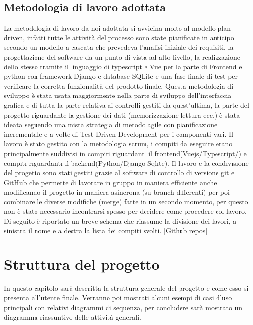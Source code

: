 \documentclass[ 4paper,11pt,openany]{book}
\newcommand{\ao}[1]{{\color{ao}[#1]}}
\begin{document}
	
\section{Metodologia di lavoro adottata}
La metodologia di lavoro da noi adottata si avvicina molto al modello plan driven, infatti tutte le attività del processo sono state pianificate in anticipo secondo un modello a cascata che prevedeva l'analisi iniziale dei requisiti, la progettazione del software da un punto di vista ad alto livello, la realizzazione dello stesso tramite il linguaggio di typescript e Vue per la parte di Frontend e python con framework Django e database SQLite e una fase finale di test per verificare la corretta funzionalità del prodotto finale.
Questa metodologia di sviluppo è stata usata maggiormente nella parte di sviluppo dell'interfaccia grafica e di tutta la parte relativa ai controlli gestiti da quest'ultima, la parte del progetto riguardante la gestione dei dati (memorizzazione lettura ecc.) è stata ideata seguendo una mista strategia di metodo agile con pianificazione incrementale e a volte di Test Driven Development per i componenti vari. Il lavoro è stato gestito con la metodologia scrum, i compiti da eseguire erano principalmente suddivisi in compiti riguardanti il frontend(Vuejs/Typescript/) e compiti riguardanti il backend(Python/Django-Sqlite). 
Il lavoro e la condivisione del progetto sono stati gestiti grazie al software di controllo di versione git e GitHub che permette di lavorare in gruppo in maniera efficiente anche modificando il progetto in maniera asincrona (su branch differenti) per poi combinare le diverse modifiche (merge) fatte in un secondo momento, per questo non è stato necessario incontrarsi spesso per decidere come procedere col lavoro.  Di seguito è riportato un breve schema che riassume la divisione dei lavori, a sinistra il nome e a destra la lista dei compiti svolti. \href{https://github.com/Job-Searching-Webpage}{\ao{Github repos}}

\clearpage
	
\chapter{Struttura del progetto}
In questo capitolo sarà descritta la struttura generale del progetto e come esso si presenta all'utente finale. Verranno poi mostrati alcuni esempi di casi d'uso principali con relativi diagrammi di sequenza, per concludere sarà mostrato un diagramma riassuntivo delle attività generali.
	
\end{document}
